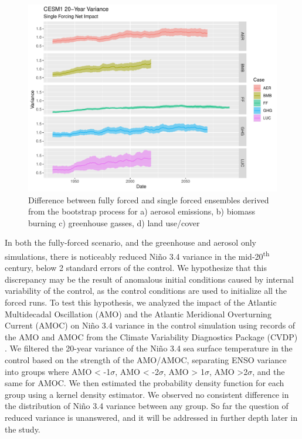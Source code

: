 \documentclass[11pt]{article}
\begin{document}
\begin{figure}[htbp]
\centering
\includegraphics[width=.9\linewidth]{../../data/figures/cesm1_sf.pdf}
\caption{\label{fig:bootstrap_1}Difference between fully forced and single forced ensembles derived from the bootstrap process for a) aerosol emissions, b) biomass burning c) greenhouse gasses, d) land use/cover}
\end{figure}

In both the fully-forced scenario, and the greenhouse and aerosol only simulations, there is noticeably reduced Niño 3.4 variance in the mid-20\textsuperscript{th} century, below 2 standard errors of the control. We hypothesize that this discrepancy may be the result of anomalous initial conditions caused by internal variability of the control, as the control conditions are used to initialize all the forced runs. To test this hypothesis, we analyzed the impact of the Atlantic Multidecadal Oscillation (AMO) and the Atlantic Meridional Overturning Current (AMOC) on Niño 3.4 variance in the control simulation using records of the AMO and AMOC from the Climate Variability Diagnostics Package (CVDP) \citep{phillips2014evaluating}. We filtered the 20-year variance of the Niño 3.4 sea surface temperature in the control based on the strength of the AMO/AMOC, separating ENSO variance into groups where AMO < -1\(\sigma\), AMO < -2\(\sigma\), AMO > 1\(\sigma\), AMO >2\(\sigma\), and the same for AMOC. We then estimated the probability density function for each group using a kernel density estimator. We observed no consistent difference in the distribution of Niño 3.4 variance between any group. So far the question of reduced variance is unanswered, and it will be addressed in further depth later in the study.
\end{document}

